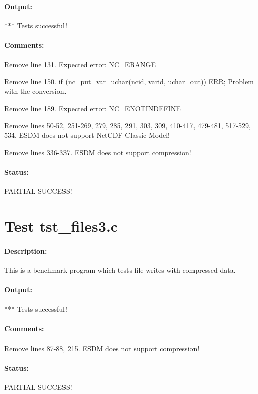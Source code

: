 \paragraph{Output:} *** Tests successful!

\paragraph{Comments:} Remove line 131. Expected error: NC\_ERANGE

Remove line 150. if (nc\_put\_var\_uchar(ncid, varid, uchar\_out)) ERR; Problem with the conversion.

Remove line 189. Expected error: NC\_ENOTINDEFINE

Remove lines 50-52, 251-269, 279, 285, 291, 303, 309, 410-417, 479-481, 517-529, 534. ESDM does not support NetCDF Classic Model!

Remove lines 336-337. ESDM does not support compression!

\paragraph{Status:} PARTIAL SUCCESS!

{\color{blue}{Help, Julian!}}

\section{Test tst\_files3.c}

\paragraph{Description:} This is a benchmark program which tests file writes with compressed data.

\paragraph{Output:} *** Tests successful!

\paragraph{Comments:} Remove lines 87-88, 215. ESDM does not support compression!

\paragraph{Status:} PARTIAL SUCCESS!

